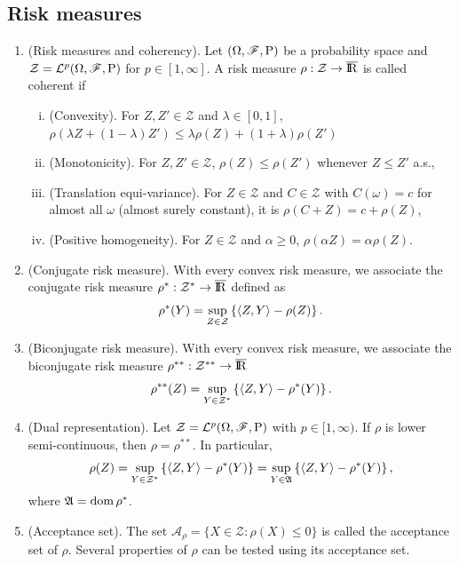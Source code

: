 \documentclass[a4paper,10pt]{article}
\begin{document}
\subsection{Risk measures}
\begin{enumerate}
 \item (Risk measures and coherency). Let $(\Omega,\mathscr{F},\mathrm{P})$ be a probability space and 
       $\mathcal{Z}=\mathcal{L}^p(\Omega,\mathscr{F},\mathrm{P})$ for $p\in[1,\infty]$. A risk measure 
       $\rho:\mathcal{Z}\to\barre$ is called coherent if
       \begin{enumerate}[i.]
        \item (Convexity). For $Z,Z'\in\mathcal{Z}$ and $\lambda\in[0,1]$, $\rho(\lambda Z + (1-\lambda)Z') 
              \leq \lambda \rho(Z) + (1+\lambda) \rho(Z')$
        \item (Monotonicity). For $Z,Z'\in\mathcal{Z}$, $\rho(Z)\leq \rho(Z')$ whenever $Z\leq Z'$ a.s.,
        \item (Translation equi-variance). For $Z\in\mathcal{Z}$ and $C\in \mathcal{Z}$ with $C(\omega)=c$
              for almost all $\omega$ (almost surely constant), it is $\rho(C+Z) = c + \rho(Z)$,
        \item (Positive homogeneity). For $Z\in\mathcal{Z}$ and $\alpha \geq 0$, $\rho(\alpha Z) = \alpha \rho(Z)$.
       \end{enumerate}   
 \item (Conjugate risk measure). With every convex risk measure, we associate the conjugate risk measure 
       $\rho^*:\mathcal{Z}^*\to\barre$ defined as
       \[
        \rho^*(Y) = \sup_{Z\in\mathcal{Z}} \left\{\langle Z,Y\rangle - \rho(Z) \right\}.
       \]
 \item (Biconjugate risk measure). With every convex risk measure,  we associate the biconjugate risk measure        
       $\rho^{**}:\mathcal{Z}^{**}\to\barre$
       \[
        \rho^{**}(Z) = \sup_{Y\in\mathcal{Z}^*} \left\{\langle Z,Y\rangle - \rho^{*}(Y) \right\}.
       \]
 \item (Dual representation). Let $\mathcal{Z}=\mathcal{L}^p(\Omega,\mathscr{F},\mathrm{P})$ with $p\in[1,\infty)$.
       If $\rho$ is lower semi-continuous, then $\rho = \rho^{**}$. In particular,
       \[
        \rho(Z) = \sup_{Y\in\mathcal{Z}^*} \left\{\langle Z,Y\rangle - \rho^{*}(Y) \right\} 
                = \sup_{Y\in\mathfrak{A}} \left\{\langle Z,Y\rangle - \rho^{*}(Y) \right\},
       \]
       where $\mathfrak{A} = \operatorname{dom} \rho^*$.
       
 \item (Acceptance set). The set $\mathcal{A}_\rho = \{X\in\mathcal{Z} : \rho(X)\leq 0\}$ is called the acceptance 
       set of $\rho$. Several properties of $\rho$ can be tested using its acceptance set.
       

\end{enumerate}
\end{document}
